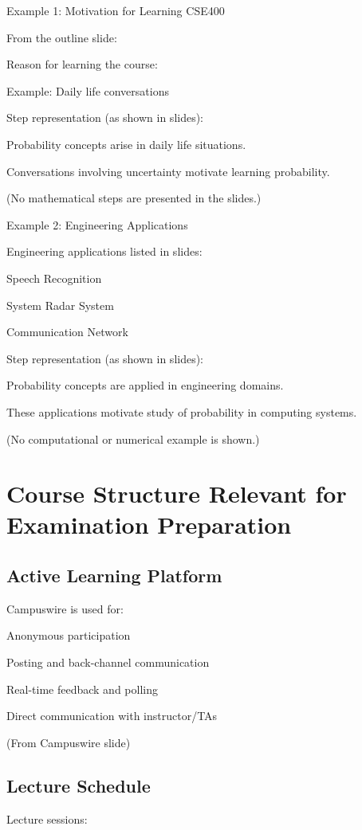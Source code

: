 \documentclass[12pt]{article}
\begin{document}
Example 1: Motivation for Learning CSE400

From the outline slide:

Reason for learning the course:

Example: Daily life conversations

Step representation (as shown in slides):

Probability concepts arise in daily life situations.

Conversations involving uncertainty motivate learning probability.

(No mathematical steps are presented in the slides.) 


Example 2: Engineering Applications

Engineering applications listed in slides:

Speech Recognition

System Radar System

Communication Network

Step representation (as shown in slides):

Probability concepts are applied in engineering domains.

These applications motivate study of probability in computing systems.

(No computational or numerical example is shown.) 


\section{Course Structure Relevant for Examination Preparation}

\subsection{Active Learning Platform}

Campuswire is used for:

Anonymous participation

Posting and back-channel communication

Real-time feedback and polling

Direct communication with instructor/TAs

(From Campuswire slide) 


\subsection{Lecture Schedule}

Lecture sessions:
\end{document}
